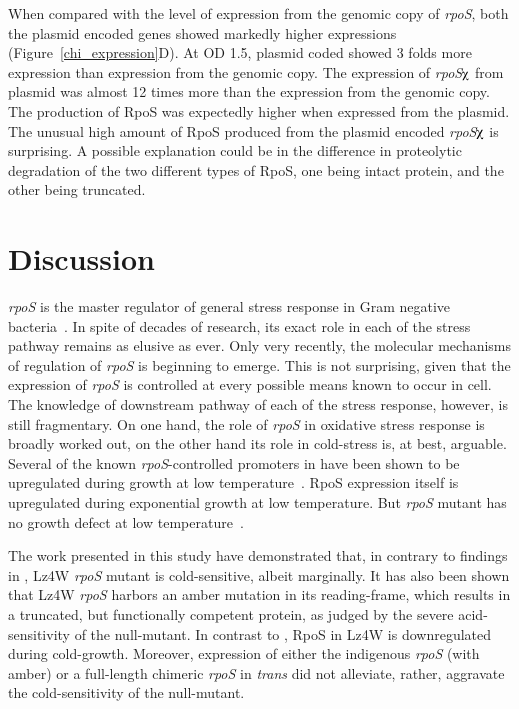 When compared with the level of expression from the genomic copy
of \emph{rpoS}, both the plasmid encoded genes showed markedly
higher expressions (Figure~\ref{chi_expression}D)\@. At
OD 1.5, plasmid coded \lzsig{} showed 3 folds more
expression than expression from the genomic copy. The expression
of \emph{rpoS}$\chiup$ from plasmid  was almost 12 times more than
the expression from the genomic copy. The production of RpoS was
expectedly higher when expressed from the plasmid. The unusual
high amount of RpoS produced from the plasmid encoded
\emph{rpoS}$\chiup$ is surprising. A possible explanation could be
in the difference in proteolytic degradation of the two different
types of RpoS, one being intact protein, and the other being
truncated.

\section{Discussion}

\emph{rpoS} is the master regulator of general stress response in
Gram negative bacteria~\citep{Hengge2002}. In spite of decades of
research, its exact role in each of the stress pathway remains as
elusive as ever. Only very recently, the molecular mechanisms of
regulation of \emph{rpoS} is beginning to emerge. This is not
surprising, given that the expression of \emph{rpoS} is controlled
at every possible means known to occur in cell. The knowledge of
downstream pathway of each of the stress response, however, is
still fragmentary. On one hand, the role of \emph{rpoS} in
oxidative stress response is broadly worked out, on the other hand
its role in cold-stress is, at best, arguable. Several of the
known \emph{rpoS}-controlled promoters in  have been
shown to be upregulated during growth at low
temperature~\citep{Sledjeski1996,Rajkumari2001}. RpoS expression
itself is upregulated during exponential growth at low
temperature. But  \emph{rpoS} mutant has no growth defect
at low temperature~\citep{Sledjeski1996}.

The work presented in this study have demonstrated that, in
contrary to findings in , Lz4W \emph{rpoS} mutant is
cold-sensitive, albeit marginally. It has also been shown that
Lz4W \emph{rpoS} harbors an amber mutation in its reading-frame,
which results in a truncated, but functionally competent protein,
as judged by the severe acid-sensitivity of the null-mutant. In
contrast to , RpoS in Lz4W is downregulated during
cold-growth. Moreover, expression of either the indigenous
\emph{rpoS} (with amber) or a full-length chimeric \emph{rpoS} in
\emph{trans} did not alleviate, rather, aggravate the
cold-sensitivity of the  null-mutant.


